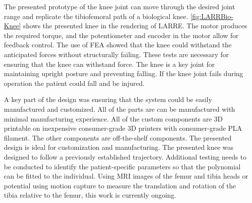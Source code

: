 The presented prototype of the knee joint can move through the desired joint range and replicate the tibiofemoral path of a biological knee. \autoref{fig:LARRBio-Knee} shows the presented knee in the rendering of LARRE. The motor produces the required torque, and the potentiometer and encoder in the motor allow for feedback control. The use of FEA showed that the knee could withstand the anticipated forces without structurally failing. These tests are necessary for ensuring that the knee can withstand force. The knee is a key joint for maintaining upright posture and preventing falling. If the knee joint fails during operation the patient could fall and be injured. 

A key part of the design was ensuring that the system could be easily manufactured and customized. All of the parts are can be manufactured with minimal manufacturing experience. All of the custom components are 3D printable on inexpensive consumer-grade 3D printers with consumer-grade PLA filament. The other components are off-the-shelf components. The presented design is ideal for customization and manufacturing. The presented knee was designed to follow a previously established trajectory. Additional testing needs to be conducted to identify the patient-specific parameters so that the polynomial can be fitted to the individual. Using MRI images of the femur and tibia heads or potential using motion capture to measure the translation and rotation of the tibia relative to the femur, this work is currently ongoing. 


